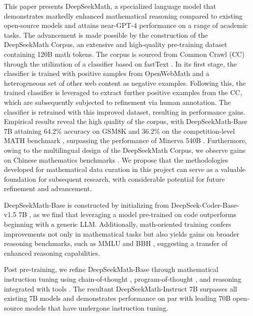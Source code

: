 This paper presents DeepSeekMath, a specialized language model that demonstrates markedly enhanced mathematical reasoning compared to existing open-source models and attains near-GPT-4 performance on a range of academic tasks. The advancement is made possible by the construction of the DeepSeekMath Corpus, an extensive and high-quality pre-training dataset containing 120B math tokens. The corpus is sourced from Common Crawl (CC) through the utilization of a classifier based on fastText \citep{joulin2016fasttext}. In its first stage, the classifier is trained with positive samples from OpenWebMath \citep{openwebmath} and a heterogeneous set of other web content as negative examples. Following this, the trained classifier is leveraged to extract further positive examples from the CC, which are subsequently subjected to refinement via human annotation. The classifier is retrained with this improved dataset, resulting in performance gains. Empirical results reveal the high quality of the corpus, with DeepSeekMath-Base 7B attaining 64.2\% accuracy on GSM8K \citep{gsm8k} and 36.2\% on the competition-level MATH benchmark \citep{MATH}, surpassing the performance of Minerva 540B \citep{minerva}. Furthermore, owing to the multilingual design of the DeepSeekMath Corpus, we observe gains on Chinese mathematics benchmarks \citep{wei2023cmath,agieval}. We propose that the methodologies developed for mathematical data curation in this project can serve as a valuable foundation for subsequent research, with considerable potential for future refinement and advancement.

DeepSeekMath-Base is constructed by initializing from DeepSeek-Coder-Base-v1.5 7B \citep{deepseek-coder}, as we find that leveraging a model pre-trained on code outperforms beginning with a generic LLM. Additionally, math-oriented training confers improvements not only in mathematical tasks but also yields gains on broader reasoning benchmarks, such as MMLU \citep{mmlu} and BBH \citep{bbh}, suggesting a transfer of enhanced reasoning capabilities.

Post pre-training, we refine DeepSeekMath-Base through mathematical instruction tuning using chain-of-thought \citep{cot}, program-of-thought \citep{pot,pal}, and reasoning integrated with tools \citep{tora}. The resultant DeepSeekMath-Instruct 7B surpasses all existing 7B models and demonstrates performance on par with leading 70B open-source models that have undergone instruction tuning.

